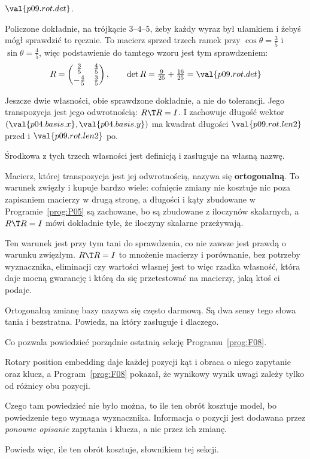 \begin{fr}
\begin{ansblock}
$\val{p09.rot.det}$.
\end{ansblock}

Policzone dokładnie, na trójkącie $3$--$4$--$5$, żeby każdy wyraz był ułamkiem
i żebyś mógł sprawdzić to ręcznie. To macierz sprzed trzech ramek przy
$\cos\theta = \tfrac{3}{5}$ i $\sin\theta = \tfrac{4}{5}$, więc podstawienie do
tamtego wzoru jest tym sprawdzeniem:
\[ R = \begin{pmatrix} \tfrac{3}{5} & \tfrac{4}{5} \\[2pt]
                       -\tfrac{4}{5} & \tfrac{3}{5} \end{pmatrix},
   \qquad \det R = \tfrac{9}{25} + \tfrac{16}{25} = \val{p09.rot.det} \]

Jeszcze dwie własności, obie sprawdzone dokładnie, a nie do tolerancji. Jego
transpozycja jest jego odwrotnością: $R\T R = I$. I zachowuje długość \dash{}
wektor $(\val{p04.basis.x}, \val{p04.basis.y})$ ma kwadrat długości
$\val{p09.rot.len2}$ przed i $\val{p09.rot.len2}$ po.
\end{fr}

\begin{fr}
Środkowa z tych trzech własności jest definicją i zasługuje na własną nazwę.

Macierz, której transpozycja jest jej odwrotnością, nazywa się
\textbf{ortogonalną}. To warunek zwięzły i kupuje bardzo wiele: cofnięcie
zmiany nie kosztuje nic poza zapisaniem macierzy w drugą stronę, a długości i
kąty zbudowane w Programie~\ref{prog:P05} są zachowane, bo są zbudowane z
iloczynów skalarnych, a $R\T R = I$ mówi dokładnie tyle, że iloczyny skalarne
przeżywają.

Ten warunek jest przy tym tani do sprawdzenia, co nie zawsze jest prawdą o
warunku zwięzłym. $R\T R = I$ to mnożenie macierzy i porównanie, bez potrzeby
wyznacznika, eliminacji czy wartości własnej \dash{} jest to więc rzadka
własność, która daje mocną gwarancję i którą da się przetestować na macierzy,
jaką ktoś ci podaje.

Ortogonalną zmianę bazy nazywa się często darmową. Są dwa sensy tego słowa
\dash{} tania i bezstratna. Powiedz, na który zasługuje i dlaczego.
\dotline
\nextframe
\end{fr}

\begin{fr}
Co pozwala powiedzieć porządnie ostatnią sekcję Programu~\ref{prog:F08}.

Rotary position embedding daje każdej pozycji kąt i obraca o niego zapytanie
oraz klucz, a Program~\ref{prog:F08} pokazał, że wynikowy wynik uwagi zależy
tylko od różnicy obu pozycji.

Czego tam powiedzieć nie było można, to ile ten obrót kosztuje model, bo
powiedzenie tego wymaga wyznacznika. Informacja o pozycji jest dodawana przez
\emph{ponowne opisanie} zapytania i klucza, a nie przez ich zmianę.

Powiedz więc, ile ten obrót kosztuje, słownikiem tej sekcji.
\dotline
\nextframe
\end{fr}

